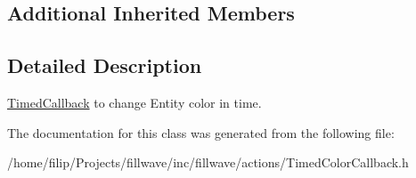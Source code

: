 \subsection*{Additional Inherited Members}


\subsection{Detailed Description}
\hyperlink{classfillwave_1_1actions_1_1TimedCallback}{Timed\+Callback} to change Entity color in time. 

The documentation for this class was generated from the following file\+:\begin{DoxyCompactItemize}
\item 
/home/filip/\+Projects/fillwave/inc/fillwave/actions/Timed\+Color\+Callback.\+h\end{DoxyCompactItemize}
